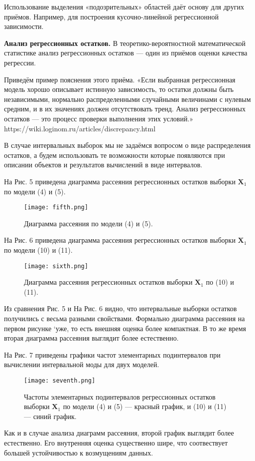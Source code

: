 \documentclass[12pt]{article}
\begin{document}
	Использование выделения «подозрительных» областей даёт основу для других приёмов. Например, для построения кусочно-линейной регрессионной зависимости.
	
	\textbf{Анализ регрессионных остатков.} В теоретико-вероятностной математической статистике анализ регрессионных остатков — один из приёмов оценки качества регрессии.
	
	Приведём пример пояснения этого приёма. «Если выбранная регрессионная модель хорошо описывает истинную зависимость, то остатки должны быть независимыми, нормально распределенными случайными величинами с нулевым средним, и в
	их значениях должен отсутствовать тренд. Анализ регрессионных остатков — это процесс проверки выполнения этих условий.»
	https://wiki.loginom.ru/articles/discrepancy.html
	
	В случае интервальных выборок мы не задаёмся вопросом о виде
	распределения остатков, а будем использовать те возможности которые
	появляются при описании объектов и результатов вычислений в виде
	интервалов.
	
	На Рис. 5 приведена диаграмма рассеяния регрессионных остатков выборки $\textbf{X}_1$ по модели (4) и (5).
	\begin{figure}[H]
		\centering
		\texttt{[image: fifth.png]}
		\caption{ Диаграмма рассеяния по модели (4) и (5).}
		\label{fig:five}
	\end{figure}
	На Рис. 6 приведена диаграмма рассеяния регрессионных остатков выборки $\textbf{X}_1$ по модели (10) и (11).
	\begin{figure}[H]
		\centering
		\texttt{[image: sixth.png]}
		\caption{ Диаграмма рассеяния регрессионных остатков выборки $\textbf{X}_1$
			по (10) и (11).}
		\label{fig:six}
	\end{figure}
	Из сравнения Рис. 5 и На Рис. 6 видно, что интервальные выборки остатков получились с весьма разными свойствами. Формально диаграмма рассеяния на первом рисунке `уже, то есть внешняя оценка более компактная. В то же время вторая диаграмма рассеяния выглядит более естественно.
	
	На Рис. 7 приведены графики частот элементарных подинтервалов при вычислении интервальной моды для двух моделей.
	\begin{figure}[H]
		\centering
		\texttt{[image: seventh.png]}
		\caption{ Частоты элементарных подинтервалов регрессионных
			остатков выборки $\textbf{X}_1$ по модели (4) и (5) — красный график, и
			(10) и (11) — синий график.}
		\label{fig:seven}
	\end{figure}
	Как и в случае анализа диаграмм рассеяния, второй график выглядит более естественно. Его внутренняя оценка существенно шире, что соотвествует большей устойчивостью к возмущениям данных.
	
\end{document}

